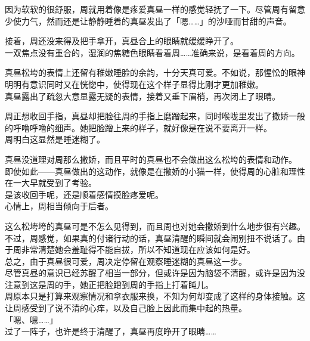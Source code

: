 因为软软的很舒服，周就用着像是疼爱真昼一样的感觉轻抚了一下。尽管周有留意少使力气，然而还是让静静睡着的真昼发出了「嗯……」的沙哑而甘甜的声音。

接着，周还没来得及把手拿开，真昼合上的眼睛就缓缓睁开了。\\

一双焦点没有重合的，湿润的焦糖色眼睛看着周……准确来说，是看着周的方向。

真昼松垮的表情上还留有稚嫩睡脸的余韵，十分天真可爱。不如说，那惺忪的眼神明明有意识同时又在恍惚中，使得现在这个样子显得比刚才更加稚嫩。\\

真昼露出了疏忽大意显露无疑的表情，接着又垂下眉梢，再次闭上了眼睛。

周正想收回手指，真昼却把脸往周的手指上磨蹭起来，同时喉咙里发出了撒娇一般的呼噜呼噜的细声。她把脸蹭上来的样子，就好像是在说不要离开一样。\\

周明白这显然是睡迷糊了。

真昼没道理对周那么撒娇，而且平时的真昼也不会做出这么松垮的表情和动作。\\

即使如此——真昼做出的这动作，就像是在撒娇的小猫一样，使得周的心脏和理性在一大早就受到了考验。\\

是该收回手呢，还是顺着感情摸脸疼爱呢。\\

心情上，周相当倾向于后者。

这么松垮垮的真昼可是不怎么见得到，而且周也对她会撒娇到什么地步很有兴趣。\\

不过，周感觉，如果真的付诸行动的话，真昼清醒的瞬间就会闹别扭不说话了。由于周非常清楚她会羞耻得不能自拔，所以不知道现在应该如何是好。\\

总之，由于真昼很可爱，周决定停留在观察睡迷糊的真昼这一步。\\

尽管真昼的意识已经苏醒了相当一部分，但或许是因为脑袋不清醒，或许是因为没注意到这是周的手，她正把脸蹭到周的手指上打着盹儿。\\

周原本只是打算来观察情况和拿衣服来换，不知为何却变成了这样的身体接触。这让周感受到了说不清的心痒，以及自己脸上因此而集中起的热量。\\

「嗯、嗯……」\\

过了一阵子，也许是终于清醒了，真昼再度睁开了眼睛……\\

